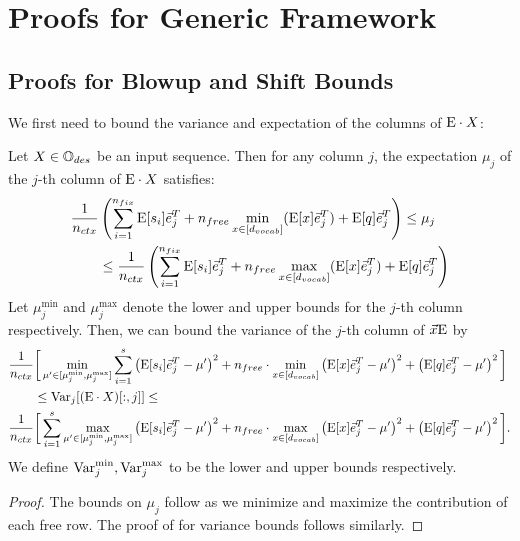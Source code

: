 \section{Proofs for Generic Framework}
\label{sec:proofs_framework}

\subsection{Proofs for Blowup and Shift Bounds}
We first need to bound the variance and expectation of the columns of $\text{E} \cdot X$:
\begin{lemma}
	\label{lem:boundsVar}
	Let $X \in \mathbb{O}_{des}$ be an input sequence.
	Then for any column $j$, the expectation $\mu_j$ of the $j$-th column of $\text{E} \cdot X$ satisfies:
	\begin{align*}
		\frac{1}{{n_{ctx}}} &\left(
			\sum_{i=1}^{n_{fix}} \text{E}[{s}_i] \vec{e}_j^T + 
			n_{free} \min_{x \in [{d_{vocab}}]} (\text{E}[x] \vec{e}_j^T) + 
			\text{E}[q]\vec{e}_j^T
		\right)
		\leq \mu_j  \\
				&\leq
				\frac{1}{{n_{ctx}}}\left(
					\sum_{i=1}^{n_{fix}} \text{E}[{s}_i]\vec{e}_j^T + 
					n_{free} \max_{x \in [{d_{vocab}}]} (\text{E}[x]\vec{e}_j^T) + 
					\text{E}[q]\vec{e}_j^T
				\right)
		\end{align*}
		Let $\mu_j^{\min}$ and $\mu_j^{\max}$ denote the lower and upper bounds for the $j$-th column respectively.
		Then, we can bound the variance of the $j$-th column of $\vec{x} \text{E}$ by
		\begin{align*}
			\frac{1}{{n_{ctx}}} &\bigg[
				\min_{\mu' \in [\mu_j^{\min}, \mu_j^{\max}]}  \sum_{i = 1}^s \left(\text{E}[{s}_i] \vec{e}_j^T -  \mu' \right)^2 + n_{free} \cdot \min_{x \in [{d_{vocab}}]} \left( \text{E}[x] \vec{e}_j^T -  \mu' \right)^2 + \left( \text{E}[q] \vec{e}_j^T -  \mu' \right)^2
			\bigg] \\
					&\leq \mathrm{Var}_j[(\text{E} \cdot X)[:, j]] \leq \\
				\frac{1}{{n_{ctx}}} &\bigg[
					\sum_{i = 1}^s \max_{\mu' \in [\mu_j^{\min}, \mu_j^{\max}]} \left(\text{E}[{s}_i] \vec{e}_j^T -  \mu' \right)^2 + n_{free} \cdot \max_{x \in [{d_{vocab}}]} \left( \text{E}[x] \vec{e}_j^T -  \mu' \right)^2 + \left( \text{E}[q] \vec{e}_j^T -  \mu' \right)^2
				\bigg].
				\end{align*}
				We define $\mathrm{Var}_j^{\min}, \mathrm{Var}_j^{\max}$ to be the lower and upper bounds respectively.
			\end{lemma}
			\begin{proof}
				The bounds on $\mu_j$ follow as we minimize and maximize the contribution of each free row.
				The proof of for variance bounds follows similarly.
			\end{proof}

